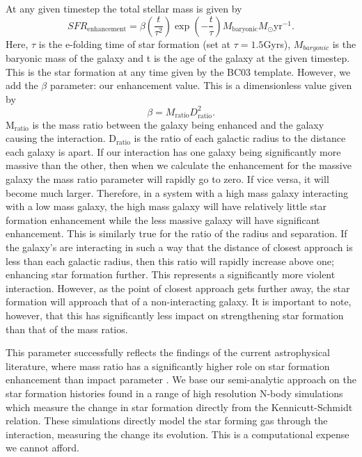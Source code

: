 At any given timestep the total stellar mass is given by
\begin{equation}\label{Total_SFR}
    SFR_{\text{enhancement}} = \beta (\frac{t}{\tau^{2}}) \exp(-\frac{t}{\tau}) M_{\text{baryonic}} M_{\odot} \text{yr}^{-1}.
\end{equation}
Here, $\tau$ is the e-folding time of star formation (set at $\tau = 1.5$Gyrs), $M_{baryonic}$ is the baryonic mass of the galaxy and t is the age of the galaxy at the given timestep. This is the star formation at any time given by the BC03 template. However, we add the $\beta$ parameter: our enhancement value. This is a dimensionless value given by
\begin{equation}\label{enhancement_param}
    \beta = M_{\text{ratio}} D_{\text{ratio}}^{2}.
\end{equation}
M$_{\text{ratio}}$ is the mass ratio between the galaxy being enhanced and the galaxy causing the interaction. D$_{\text{ratio}}$ is the ratio of each galactic radius to the distance each galaxy is apart. If our interaction has one galaxy being significantly more massive than the other, then when we calculate the enhancement for the massive galaxy the mass ratio parameter will rapidly go to zero. If vice versa, it will become much larger. Therefore, in a system with a high mass galaxy interacting with a low mass galaxy, the high mass galaxy will have relatively little star formation enhancement while the less massive galaxy will have significant enhancement. This is similarly true for the ratio of the radius and separation. If the galaxy's are interacting in such a way that the distance of closest approach is less than each galactic radius, then this ratio will rapidly increase above one; enhancing star formation further. This represents a significantly more violent interaction. However, as the point of closest approach gets further away, the star formation will approach that of a non-interacting galaxy. It is important to note, however, that this has significantly less impact on strengthening star formation than that of the mass ratios. 

This parameter successfully reflects the findings of the current astrophysical literature, where mass ratio has a significantly higher role on star formation enhancement than impact parameter \citep{Barton_Gillespie_03, Lotz_08, Li_08}. We base our semi-analytic approach on the star formation histories found in a range of high resolution N-body simulations \citep{Mihos_96, Springel_00, Rodrigue-Montero_19} which measure the change in star formation directly from the Kennicutt-Schmidt \citep{Kennicutt_98} relation. These simulations directly model the star forming gas through the interaction, measuring the change its evolution. This is a computational expense we cannot afford.

